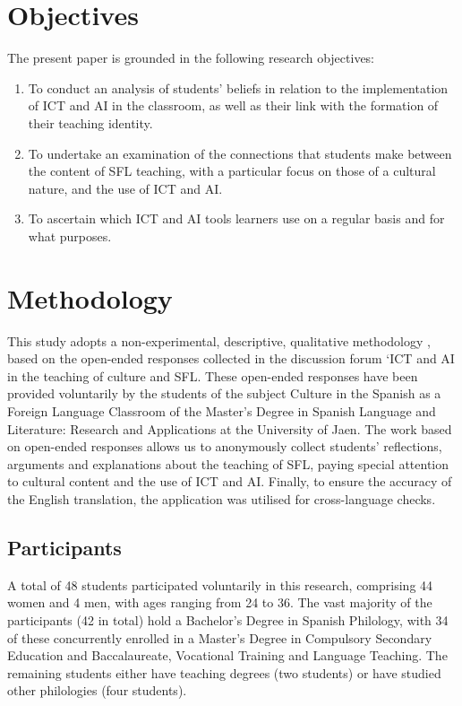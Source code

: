 \documentclass[english]{textolivre}
\begin{document}
\section{Objectives}
The present paper is grounded in the following research objectives:

\begin{enumerate}
    \item To conduct an analysis of students' beliefs in relation to the implementation of ICT and AI in the classroom, as well as their link with the formation of their teaching identity.
    \item To undertake an examination of the connections that students make between the content of SFL teaching, with a particular focus on those of a cultural nature, and the use of ICT and AI.
    \item To ascertain which ICT and AI tools learners use on a regular basis and for what purposes.
\end{enumerate}

\section{Methodology}
This study adopts a non-experimental, descriptive, qualitative methodology \cite{bourque2004, fowler2014}, based on the open-ended responses collected in the discussion forum ‘ICT and AI in the teaching of culture and SFL. These open-ended responses have been provided voluntarily by the students of the subject Culture in the Spanish as a Foreign Language Classroom of the Master's Degree in Spanish Language and Literature: Research and Applications at the University of Jaen. The work based on open-ended responses allows us to anonymously collect students' reflections, arguments and explanations about the teaching of SFL, paying special attention to cultural content and the use of ICT and AI.
 Finally, to ensure the accuracy of the English translation, the application \textcite{deepl2025} was utilised for cross-language checks.

\subsection{Participants}
A total of 48 students participated voluntarily in this research, comprising 44 women and 4 men, with ages ranging from 24 to 36. The vast majority of the participants (42 in total) hold a Bachelor's Degree in Spanish Philology, with 34 of these concurrently enrolled in a Master's Degree in Compulsory Secondary Education and Baccalaureate, Vocational Training and Language Teaching. The remaining students either have teaching degrees (two students) or have studied other philologies (four students).
\end{document}
